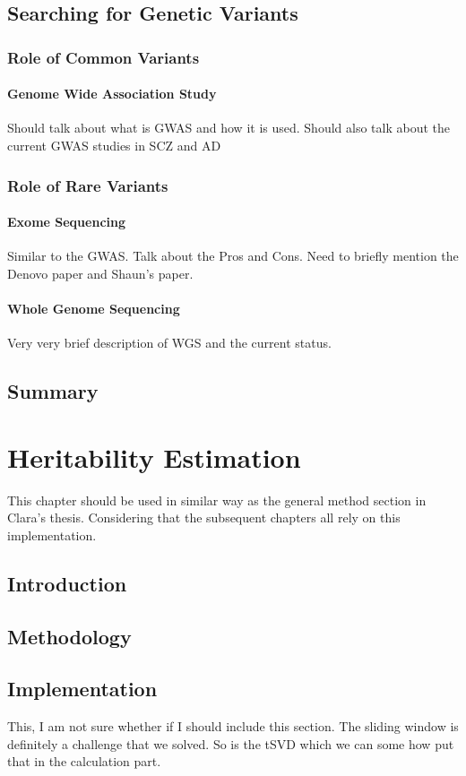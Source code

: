 \documentclass{book}
\begin{document}
	\section{Searching for Genetic Variants}
	\subsection{Role of Common Variants}
	\subsubsection{Genome Wide Association Study}
	Should talk about what is GWAS and how it is used.
	Should also talk about the current GWAS studies in SCZ and AD
	\subsection{Role of Rare Variants}
	\subsubsection{Exome Sequencing}
	Similar to the GWAS.
	Talk about the Pros and Cons.
	Need to briefly mention the Denovo paper and Shaun's paper.					
	\subsubsection{Whole Genome Sequencing}
	Very very brief description of WGS and the current status.
	
	\section{Summary}
	
	\chapter{Heritability Estimation}
	This chapter should be used in similar way as the general method section in Clara's thesis. Considering that the subsequent chapters all rely on this implementation.
	\section{Introduction}
	\section{Methodology}
	\section{Implementation}
	This, I am not sure whether if I should include this section. 
	The sliding window is definitely a challenge that we solved.
	So is the tSVD which we can some how put that in the calculation part.
	
\end{document}
